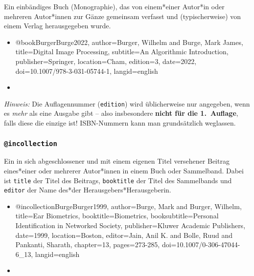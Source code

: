 Ein einbändiges Buch (Monographie), das von einem*einer Autor*in oder mehreren Autor*innen zur Gänze gemeinsam
verfasst und (typischerweise) von einem Verlag herausgegeben wurde.
% 
\begin{itemize}
\item[] 
\begin{GenericCode}[numbers=none]
@book{BurgerBurge2022,
	author={Burger, Wilhelm and Burge, Mark James},
	title={Digital Image Processing},
	subtitle={An Algorithmic Introduction},
	publisher={Springer},
	location={Cham},
	edition={3},
	date={2022},
	doi={10.1007/978-3-031-05744-1},
	langid={english}
}
\end{GenericCode}
\item[\cite{BurgerBurge2022}] 
\end{itemize}
%
\emph{Hinweis:} Die Auflagennummer (\texttt{edition}) wird üblicherweise nur angegeben, wenn es \emph{mehr} als eine
Ausgabe gibt -- also insbesondere \textbf{nicht für die 1.\ Auflage}, falls diese die einzige ist! ISBN-Nummern kann
man grundsätzlich weglassen.


\subsubsection{\texttt{\bfseries @incollection}}
\label{sec:@incollection}

Ein in sich abgeschlossener und mit einem eigenen Titel versehener Beitrag eines*einer oder mehrerer Autor*innen in
einem Buch oder Sammelband. Dabei ist \texttt{title} der Titel des Beitrags, \texttt{booktitle} der Titel des
Sammelbands und \texttt{editor} der Name des*der Herausgebers*Herausgeberin.
%
\begin{itemize}
\item[] 
\begin{GenericCode}[numbers=none]
@incollection{BurgeBurger1999,
  author={Burge, Mark and Burger, Wilhelm},
  title={Ear Biometrics},
  booktitle={Biometrics},
  booksubtitle={Personal Identification in Networked Society},
  publisher={Kluwer Academic Publishers},
  date={1999},
  location={Boston},
  editor={Jain, Anil K. and Bolle, Ruud and Pankanti, Sharath},
  chapter={13},
  pages={273-285},
  doi={10.1007/0-306-47044-6_13},
  langid={english}
}
\end{GenericCode}
\item[\cite{BurgeBurger1999}] 
\end{itemize}


